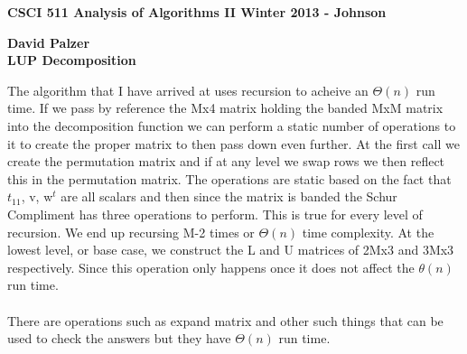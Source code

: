 \documentclass[11pt]{article}
\begin{document}
\textbf{CSCI 511 Analysis of Algorithms II \hfill Winter 2013 - Johnson}

\begin{center}
\textbf{David Palzer \\ LUP Decomposition}
\end{center}
The algorithm that I have arrived at uses recursion to acheive an $\Theta(n)$ run time. If we pass by reference the Mx4 matrix holding the banded MxM matrix into the decomposition function we can perform a static number of operations to it to create the proper matrix to then pass down even further. At the first call we create the permutation matrix and if at any level we swap rows we then reflect this in the permutation matrix. The operations are static based on the fact that $t_{11}$, v, w$^{t}$ are all scalars and then since the matrix is banded the Schur Compliment has three operations to perform. This is true for every level of recursion. We end up recursing M-2 times or $\Theta(n)$ time complexity. At the lowest level, or base case, we construct the L and U matrices of 2Mx3 and 3Mx3 respectively. Since this operation only happens once it does not affect the $\theta(n)$ run time.\\\\
There are operations such as expand matrix and other such things that can be used to check the answers but they have $\Theta(n)$ run time.
\end{document}
